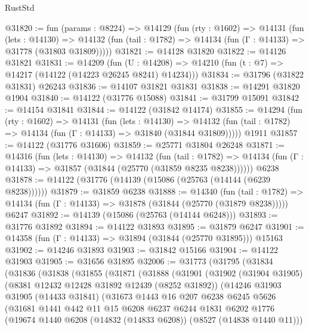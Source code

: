 \begin{lexlean}{RustStd}
\begin{coremodule}
@31820 := fun (params : @8224) =>
  @14129
    (fun (rty : @1602) =>
    @14131
      (fun (lets : @14130) =>
      @14132 (fun (tail : @1782) => @14134 (fun (Γ : @14133) => @31778 (@31803 @31809)))))
@31821 := @14128 @31820
@31822 := @14126 @31821
@31831 := @14209
    (fun (U : @14208) => @14210 (fun (t : @7) => @14217 (@14122 (@14223 @26245 @8241) @14234)))
@31834 := @31796 (@31822 @31831) @26243
@31836 := @14107 @31821 @31831
@31838 := @14291 @31820 @1904
@31840 := @14122 (@31776 @15088)
@31841 := @31799 @15091
@31842 := @14154 @31841
@31844 := @14122 (@31842 @14174)
@31855 := @14294
    (fun (rty : @1602) =>
    @14131
      (fun (lets : @14130) =>
      @14132 (fun (tail : @1782) => @14134 (fun (Γ : @14133) => @31840 (@31844 @31809)))))
    @1911
@31857 := @14122 (@31776 @31606)
@31859 := @25771 @31804 @26248
@31871 := @14316
    (fun (lets : @14130) =>
    @14132
      (fun (tail : @1782) =>
      @14134 (fun (Γ : @14133) => @31857 (@31844 (@25770 (@31859 @8235 @8238))))))
    @6238
@31878 := @14122 (@31776 (@14139 (@15086 (@25763 (@14144 (@6239 @8238))))))
@31879 := @31859 @6238
@31888 := @14340
    (fun (tail : @1782) => @14134 (fun (Γ : @14133) => @31878 (@31844 (@25770 (@31879 @8238)))))
    @6247
@31892 := @14139 (@15086 (@25763 (@14144 @6248)))
@31893 := @31776 @31892
@31894 := @14122 @31893
@31895 := @31879 @6247
@31901 := @14358 (fun (Γ : @14133) => @31894 (@31844 (@25770 @31895))) @15163
@31902 := @14246 @31893
@31903 := @31842 @15166
@31904 := @14122 @31903
@31905 := @31656 @31895
@32006 := @31773
    (@31795
      (@31834
        (@31836
          (@31838
            (@31855
              (@31871
                (@31888
                  (@31901
                    (@31902
                      (@31904 @31905)
                      (@8381 @12432 @12428 @31892 @12439 (@8252 @31892))
                      (@14246
                        @31903
                        @31905
                        (@14433 @31841)
                        (@31673
                          @1443
                          @16
                          @207
                          @6238
                          @6245
                          @5626
                          (@31681
                            @1441
                            @442
                            @11
                            @15
                            @6208
                            @6237
                            @6244
                            @1831
                            @6202
                            @1776
                            (@19674 @1440 @6208 (@14832 (@14833 @6208)) (@8527 (@14838 @1440 @11)))

\end{coremodule}
\end{lexlean}
